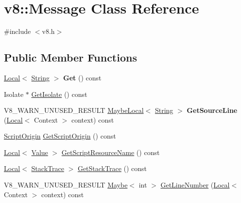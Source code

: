 \hypertarget{classv8_1_1Message}{}\section{v8\+:\+:Message Class Reference}
\label{classv8_1_1Message}


{\ttfamily \#include $<$v8.\+h$>$}

\subsection*{Public Member Functions}
\begin{DoxyCompactItemize}
\item 
\mbox{\label{classv8_1_1Message_a75be72a4c94c3c1bf1c6ea8ffc47c992}} 
\mbox{\hyperlink{classv8_1_1Local}{Local}}$<$ \mbox{\hyperlink{classv8_1_1String}{String}} $>$ {\bfseries Get} () const
\item 
Isolate $\ast$ \mbox{\hyperlink{classv8_1_1Message_a42aa664083e0fd29ab802c289b87d52b}{Get\+Isolate}} () const
\item 
\mbox{\label{classv8_1_1Message_ab0d34a29be64b00d8379e395fb193200}} 
V8\+\_\+\+W\+A\+R\+N\+\_\+\+U\+N\+U\+S\+E\+D\+\_\+\+R\+E\+S\+U\+LT \mbox{\hyperlink{classv8_1_1MaybeLocal}{Maybe\+Local}}$<$ \mbox{\hyperlink{classv8_1_1String}{String}} $>$ {\bfseries Get\+Source\+Line} (\mbox{\hyperlink{classv8_1_1Local}{Local}}$<$ Context $>$ context) const
\item 
\mbox{\hyperlink{classv8_1_1ScriptOrigin}{Script\+Origin}} \mbox{\hyperlink{classv8_1_1Message_a3530ffb45b802c46a47349e610402a3c}{Get\+Script\+Origin}} () const
\item 
\mbox{\hyperlink{classv8_1_1Local}{Local}}$<$ \mbox{\hyperlink{classv8_1_1Value}{Value}} $>$ \mbox{\hyperlink{classv8_1_1Message_a843084f6838bd58d5fd888ab460cb2d4}{Get\+Script\+Resource\+Name}} () const
\item 
\mbox{\hyperlink{classv8_1_1Local}{Local}}$<$ \mbox{\hyperlink{classv8_1_1StackTrace}{Stack\+Trace}} $>$ \mbox{\hyperlink{classv8_1_1Message_a4b10ab26bf81c74301bcd93750fd077e}{Get\+Stack\+Trace}} () const
\item 
V8\+\_\+\+W\+A\+R\+N\+\_\+\+U\+N\+U\+S\+E\+D\+\_\+\+R\+E\+S\+U\+LT \mbox{\hyperlink{classv8_1_1Maybe}{Maybe}}$<$ int $>$ \mbox{\hyperlink{classv8_1_1Message_a14934ab71695e916dfacb31b932e21d7}{Get\+Line\+Number}} (\mbox{\hyperlink{classv8_1_1Local}{Local}}$<$ Context $>$ context) const

\end{DoxyCompactItemize}
